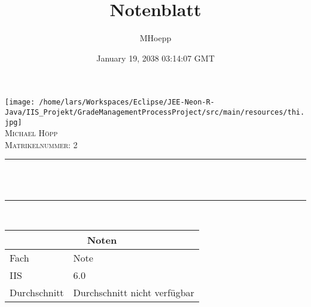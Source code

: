 \documentclass[12pt]{article}
\title{Notenblatt}
\author{MHoepp}
\date{January 19, 2038 03:14:07 GMT}
\makeatletter
\let\thetitle\@title
\makeatother
\begin{document}
   
   
    \begin{titlepage}
        \centering
        \texttt{[image: /home/lars/Workspaces/Eclipse/JEE-Neon-R-Java/IIS\_Projekt/GradeManagementProcessProject/src/main/resources/thi.jpg]}\\[0.5 cm] 
        \textsc{\Large Michael Höpp}\\[1.0 cm] %
        \textsc{Matrikelnummer: 2}\\[0.25 cm]               %
        \rule{\linewidth}{0.2 mm} \\[0.2 cm]
        { \huge \bfseries \thetitle}\\
        \rule{\linewidth}{0.2 mm} \\[0.75 cm]
       
       
       
        \setlength{\arrayrulewidth}{1mm}
        \setlength{\tabcolsep}{12pt}
        \renewcommand{\arraystretch}{2.5}
        {
            \begin{tabular}{ |p{5cm}|p{1.5cm}|  }
                \hline
                \multicolumn{2}{|c|}{Noten} \\
                \hline
                Fach& Note  \\
                \hline
IIS & 6.0\\


               
               
               
                \hline
                Durchschnitt & Durchschnitt nicht verfügbar  \\
                \hline
            \end{tabular}
        }
       
       
       
       
       
       
       
    \end{titlepage}
   
   
   
\end{document}
